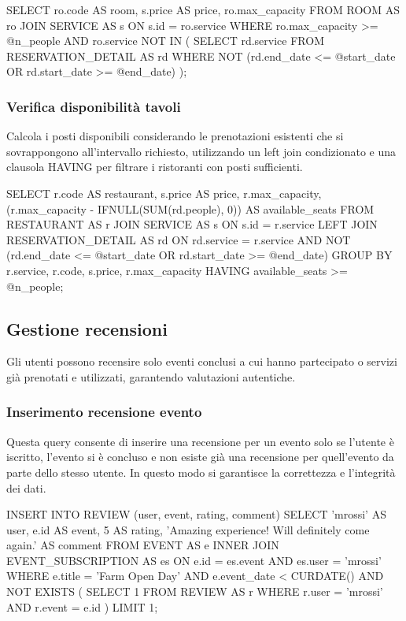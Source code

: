 \documentclass[a4paper,12pt]{report}
\begin{document}
\begin{sqlcode}[caption={}]
SELECT
  ro.code AS room,
  s.price AS price,
  ro.max_capacity
FROM ROOM AS ro
JOIN SERVICE AS s
  ON s.id = ro.service
WHERE
  ro.max_capacity >= @n_people
  AND ro.service NOT IN (
    SELECT rd.service
    FROM RESERVATION_DETAIL AS rd
    WHERE NOT (rd.end_date <= @start_date OR rd.start_date >= @end_date)
  );
\end{sqlcode}

\subsubsection{Verifica disponibilità tavoli}
Calcola i posti disponibili considerando le prenotazioni esistenti
che si sovrappongono all'intervallo richiesto, utilizzando un left
join condizionato e una clausola HAVING per filtrare i ristoranti con
posti sufficienti.

\begin{sqlcode}[caption={}]
SELECT
  r.code AS restaurant,
  s.price AS price,
  r.max_capacity,
  (r.max_capacity - IFNULL(SUM(rd.people), 0)) AS available_seats
FROM RESTAURANT AS r
JOIN SERVICE AS s ON s.id = r.service
LEFT JOIN RESERVATION_DETAIL AS rd ON rd.service = r.service
  AND NOT (rd.end_date <= @start_date OR rd.start_date >= @end_date)
GROUP BY r.service, r.code, s.price, r.max_capacity
HAVING available_seats >= @n_people;
\end{sqlcode}

\newpage
\subsection{Gestione recensioni}
Gli utenti possono recensire solo eventi conclusi a cui hanno
partecipato o servizi già prenotati e utilizzati, garantendo
valutazioni autentiche.

\subsubsection{Inserimento recensione evento}
Questa query consente di inserire una recensione per un evento solo
se l'utente è iscritto, l'evento si è concluso e non esiste già una
recensione per quell'evento da parte dello stesso utente. In questo
modo si garantisce la correttezza e l'integrità dei dati.

\begin{sqlcode}[caption={}]
INSERT INTO REVIEW (user, event, rating, comment)
SELECT
  'mrossi' AS user,
  e.id AS event,
  5 AS rating,
  'Amazing experience! Will definitely come again.' AS comment
FROM EVENT AS e
INNER JOIN EVENT_SUBSCRIPTION AS es ON e.id = es.event
  AND es.user = 'mrossi'
WHERE
  e.title = 'Farm Open Day'
  AND e.event_date < CURDATE()
    AND NOT EXISTS (
      SELECT 1
      FROM REVIEW AS r
      WHERE r.user = 'mrossi' AND r.event = e.id
  )
LIMIT 1;
\end{sqlcode}
\end{document}
